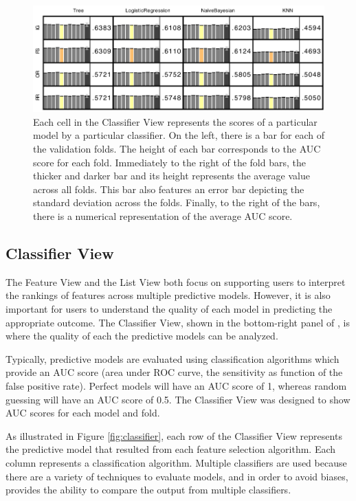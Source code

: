 \begin{figure}[b]
\centering
\includegraphics[width=0.5\linewidth]{infuse/classifier-cell}
\caption{
Each cell in the Classifier View represents the scores of a particular model by a particular classifier.
On the left, there is a bar for each of the validation folds.  The height of each bar corresponds to the AUC score for each fold.  Immediately to the right of the fold bars, the thicker and darker bar and its height represents the average value across all folds.  This bar also features an error bar depicting the standard deviation across the folds.  Finally, to the right of the bars, there is a numerical representation of the average AUC score.}
\label{fig:classifier-cell}
\end{figure}

\subsection{Classifier View}

The Feature View and the List View both focus on supporting users to interpret the rankings of features across multiple predictive models.  However, it is also important for users to understand the quality of each model in predicting the appropriate outcome.  The Classifier View, shown in the bottom-right panel of \infuse, is where the quality of each the predictive models can be analyzed.

Typically, predictive models are evaluated using classification algorithms which provide an AUC score (area under ROC curve,
the sensitivity as function of the false positive rate).  Perfect models will have an AUC score of 1, whereas random guessing will have an AUC score of 0.5.  The Classifier View was designed to show AUC scores for each model and fold.

As illustrated in Figure \ref{fig:classifier}, each row of the Classifier View represents the predictive model that resulted from each feature selection algorithm.  Each column represents a classification algorithm.  Multiple classifiers are used because there are a variety of techniques to evaluate models, and in order to avoid biases, \infuse provides the ability to compare the output from multiple classifiers.

